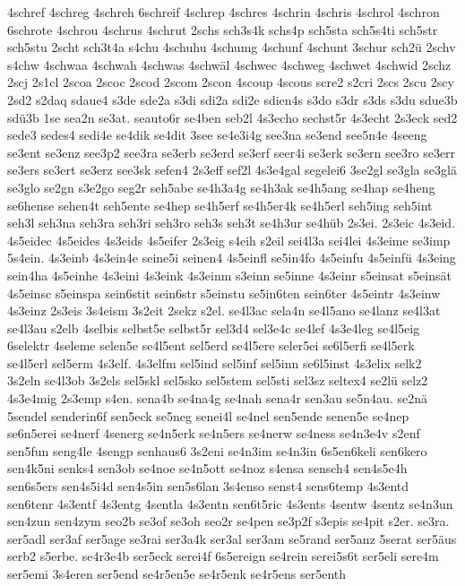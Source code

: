 {4schref
4schreg
4schreh
6schreif
4schrep
4schres
4schrin
4schris
4schrol
4schron
6schrote
4schrou
4schrus
4schrut
2schs
sch3s4k
schs4p
sch5sta
sch5s4ti
sch5str
sch5stu
2scht
sch3t4a
s4chu
4schuhu
4schumg
4schunf
4schunt
3schur
sch2ü
2schv
s4chw
4schwaa
4schwah
4schwas
4schwäl
4schwec
4schweg
4schwet
4schwid
2schz
2scj
2s1cl
2scoa
2scoc
2scod
2scom
2scon
4scoup
4scous
scre2
s2cri
2scs
2scu
2scy
2sd2
s2daq
sdaue4
s3de
sde2a
s3di
sdi2a
sdi2e
sdien4s
s3do
s3dr
s3ds
s3du
sdue3b
sdü3b
1se
sea2n
se3at.
seauto6r
se4ben
seb2l
4s3echo
sechst5r
4s3echt
2s3eck
sed2
sede3
sedes4
sedi4e
se4dik
se4dit
3see
se4e3i4g
see3na
se3end
see5n4e
4seeng
se3ent
se3enz
see3p2
see3ra
se3erb
se3erd
se3erf
seer4i
se3erk
se3ern
see3ro
se3err
se3ers
se3ert
se3erz
see3sk
sefen4
2s3eff
sef2l
4s3e4gal
segelei6
3se2gl
se3gla
se3glä
se3glo
se2gn
s3e2go
seg2r
seh5abe
se4h3a4g
se4h3ak
se4h5ang
se4hap
se4heng
se6hense
sehen4t
seh5ente
se4hep
se4h5erf
se4h5er4k
se4h5erl
seh5ing
seh5int
seh3l
seh3na
seh3ra
seh3ri
seh3ro
seh3s
seh3t
se4h3ur
se4hüb
2s3ei.
2s3eic
4s3eid.
4s5eidec
4s5eides
4s3eids
4s5eifer
2s3eig
s4eih
s2eil
sei4l3a
sei4lei
4s3eime
se3imp
5s4ein.
4s3einb
4s3ein4e
seine5i
seinen4
4s5einfl
se5in4fo
4s5einfu
4s5einfü
4s3eing
sein4ha
4s5einhe
4s3eini
4s3eink
4s3einm
s3einn
se5inne
4s3einr
s5einsat
s5einsät
4s5einsc
s5einspa
sein6stit
sein6str
s5einstu
se5in6ten
sein6ter
4s5eintr
4s3einw
4s3einz
2s3eis
3s4eism
3s2eit
2sekz
s2el.
se4l3ac
sela4n
se4l5ano
se4lanz
se4l3at
se4l3au
s2elb
4selbis
selbst5e
selbst5r
sel3d4
sel3e4c
se4lef
4s3e4leg
se4l5eig
6selektr
4seleme
selen5e
se4l5ent
sel5erd
se4l5ere
seler5ei
se6l5erfi
se4l5erk
se4l5erl
sel5erm
4s3elf.
4s3elfm
sel5ind
sel5inf
sel5inn
se6l5inst
4s3elix
selk2
3s2eln
se4l3ob
3s2els
sel5skl
sel5sko
sel5stem
sel5sti
sel3sz
seltex4
se2lü
selz2
4s3e4mig
2s3emp
s4en.
sena4b
se4na4g
se4nah
sena4r
sen3au
se5n4au.
se2nä
5sendel
senderin6f
sen5eck
se5neg
senei4l
se4nel
sen5ende
senen5e
se4nep
se6n5erei
se4nerf
4senerg
se4n5erk
se4n5ers
se4nerw
se4ness
se4n3e4v
s2enf
sen5fun
seng4le
4sengp
senhaus6
3s2eni
se4n3im
se4n3in
6s5en6keli
sen6kero
sen4k5ni
senks4
sen3ob
se4noe
se4n5ott
se4noz
s4ensa
sensch4
sen4s5e4h
sen6s5ers
sen4s5i4d
sen4s5in
sen5s6lan
3s4enso
senst4
sens6temp
4s3entd
sen6tenr
4s3entf
4s3entg
4sentla
4s3entn
sen6t5ric
4s3ents
4sentw
4sentz
se4n3un
sen4zun
sen4zym
seo2b
se3of
se3oh
seo2r
se4pen
se3p2f
s3epis
se4pit
s2er.
se3ra.
ser5adl
ser3af
ser5age
se3rai
ser3a4k
ser3al
ser3am
se5rand
ser5anz
5serat
ser5äus
serb2
s5erbe.
se4r3e4b
ser5eck
serei4f
6s5ereign
se4rein
serei5s6t
ser5eli
sere4m
ser5emi
3s4eren
ser5end
se4r5en5e
se4r5enk
se4r5ens
ser5enth
}
